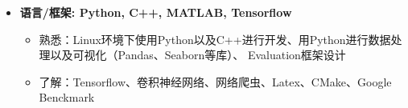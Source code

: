   \begin{itemize}[leftmargin=*]
    \item \textbf{语言/框架: Python, C++, MATLAB, Tensorflow} %
    {\small
      \begin{itemize}
        \item{熟悉：Linux环境下使用Python以及C++进行开发、用Python进行数据处理以及可视化（Pandas、Seaborn等库）、
        Evaluation框架设计}
        \item{了解：Tensorflow、卷积神经网络、网络爬虫、Latex、CMake、Google Benckmark}
         
      \end{itemize}
      }
  \end{itemize}